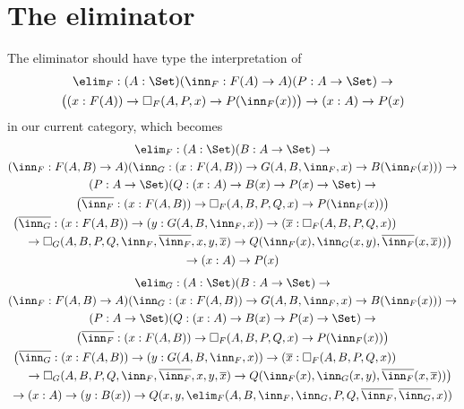 \documentclass{article}
\begin{document}
\section{The eliminator}

The eliminator should have type the interpretation of 
\begin{multline*}
  \elim_{F} : (A : \Set)(\inn_{F} : F(A)
  \to A)(P : A \to \Set) \to \\
  \big( (x : F(A)) \to \square_{F}(A, P, x) \to P(\inn_{F}(x))\big)
  \to (x : A) \to P(x)
\end{multline*}
in our current category, which becomes
\begin{multline*}
  \elim_{F} : (A : \Set)(B : A \to \Set) \to \\
   (\inn_{F} : F(A, B) \to A)(\inn_G : (x : F(A, B)) \to G(A, B, \inn_F, x) \to B(\inn_F(x))) \to \\
(P : A \to \Set)(Q : (x : A) \to B(x) \to P(x) \to \Set) \to \\
 \big(\overline{\inn_F} : (x : F(A, B)) \to \square_{F}(A, B, P, Q, x) \to P(\inn_F(x))\big) \\
 \begin{multlined}
   \big( \overline{\inn_G} : (x : F(A, B)) \to (y : G(A, B, \inn_F, x)) \to
   (\overline{x} : \square_F(A, B, P, Q, x)) \\ \to
   \square_{G}(A, B, P, Q, \inn_F, \overline{\inn_F}, x, y,
   \overline{x}) \to Q(\inn_F(x), \inn_{G}(x, y), \overline{\inn_F}(x, \overline{x}))\big)
 \end{multlined} \\
  \to (x : A) \to P(x)
\end{multline*}
\begin{multline*}
  \elim_{G} : (A : \Set)(B : A \to \Set) \to \\
   (\inn_{F} : F(A, B) \to A)(\inn_G : (x : F(A, B)) \to G(A, B, \inn_F, x) \to B(\inn_F(x))) \to \\
(P : A \to \Set)(Q : (x : A) \to B(x) \to P(x) \to \Set) \to \\
 \big(\overline{\inn_F} : (x : F(A, B)) \to \square_{F}(A, B, P, Q, x) \to P(\inn_F(x))\big) \\
 \begin{multlined}
   \big( \overline{\inn_G} : (x : F(A, B)) \to (y : G(A, B, \inn_F, x)) \to
   (\overline{x} : \square_F(A, B, P, Q, x)) \\ \to
   \square_{G}(A, B, P, Q, \inn_F, \overline{\inn_F}, x, y,
   \overline{x}) \to Q(\inn_F(x), \inn_{G}(x, y), \overline{\inn_F}(x, \overline{x}))\big)
 \end{multlined} \\
  \to (x : A) \to (y : B(x)) \to Q(x, y, \elim_F(A, B, \inn_F, \inn_G, P, Q, \overline{\inn_F}, \overline{\inn_G}, x))
\end{multline*}
\end{document}
